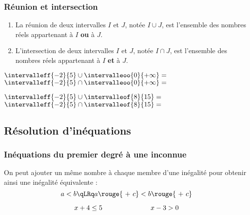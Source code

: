 \documentclass[xcolor={dvipsnames,svgnames,table}]{beamer}
\begin{document}
\subsubsection{Réunion et intersection}

\begin{frame}
    \begin{definition}
        \begin{enumerate}[<+->]
            \item La \alert{réunion} de deux intervalles $I$ et $J$, notée $I \cup J$, est l'ensemble des nombres réels appartenant à $I$ \textbf{ou} à $J$.
            \item L'\alert{intersection} de deux intervalles $I$ et $J$, notée $I \cap J$, est l'ensemble des nombres réels appartenant à $I$ \textbf{et} à $J$.
        \end{enumerate}
    \end{definition}
\end{frame}

\begin{frame}
    \begin{Examples}
    $\intervalleff{-2}{5} \cup \intervalleoo{0}{+\infty} = $ \hspace{2cm} $\intervalleff{-2}{5} \cap \intervalleoo{0}{+\infty} =$ \vspace{2cm}

    $\intervalleff{-2}{5} \cup \intervalleof{8}{15} = $ \hspace{3cm} $\intervalleff{-2}{5} \cap \intervalleof{8}{15} = $\vspace{2cm}
    \end{Examples}
\end{frame}

\subsection{Résolution d'inéquations}
\subsubsection{Inéquations du premier degré à une inconnue}

\begin{frame}
    \begin{Prop}
        On peut ajouter un même nombre à chaque membre d'une inégalité pour obtenir ainsi une inégalité équivalente :
        \[a < b \qLRq a \rouge{\ +\ c } < b \rouge{\ +\ c}\]
    \end{Prop}
\pause
    \begin{Examples}
        \[x + 4 \leq 5 \hspace{2.5cm} x - 3 > 0\]
        \rule{0pt}{3cm}
    \end{Examples}
\end{frame}
\end{document}
